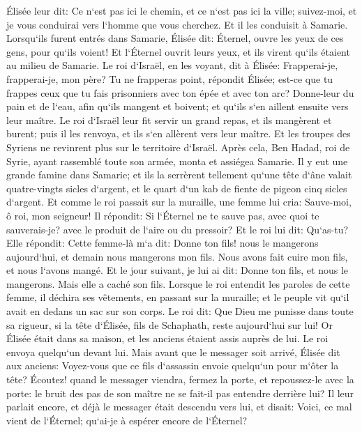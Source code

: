 \verse Élisée leur dit: Ce n`est pas ici le chemin, et ce n`est pas ici la ville; suivez-moi, et je vous conduirai vers l`homme que vous cherchez. Et il les conduisit à Samarie. 
\verse Lorsqu`ils furent entrés dans Samarie, Élisée dit: Éternel, ouvre les yeux de ces gens, pour qu`ils voient! Et l`Éternel ouvrit leurs yeux, et ils virent qu`ils étaient au milieu de Samarie. 
\verse Le roi d`Israël, en les voyant, dit à Élisée: Frapperai-je, frapperai-je, mon père? 
\verse Tu ne frapperas point, répondit Élisée; est-ce que tu frappes ceux que tu fais prisonniers avec ton épée et avec ton arc? Donne-leur du pain et de l`eau, afin qu`ils mangent et boivent; et qu`ils s`en aillent ensuite vers leur maître. 
\verse Le roi d`Israël leur fit servir un grand repas, et ils mangèrent et burent; puis il les renvoya, et ils s`en allèrent vers leur maître. Et les troupes des Syriens ne revinrent plus sur le territoire d`Israël. 
\verse Après cela, Ben Hadad, roi de Syrie, ayant rassemblé toute son armée, monta et assiégea Samarie. 
\verse Il y eut une grande famine dans Samarie; et ils la serrèrent tellement qu`une tête d`âne valait quatre-vingts sicles d`argent, et le quart d`un kab de fiente de pigeon cinq sicles d`argent. 
\verse Et comme le roi passait sur la muraille, une femme lui cria: Sauve-moi, ô roi, mon seigneur! 
\verse Il répondit: Si l`Éternel ne te sauve pas, avec quoi te sauverais-je? avec le produit de l`aire ou du pressoir? 
\verse Et le roi lui dit: Qu`as-tu? Elle répondit: Cette femme-là m`a dit: Donne ton fils! nous le mangerons aujourd`hui, et demain nous mangerons mon fils. 
\verse Nous avons fait cuire mon fils, et nous l`avons mangé. Et le jour suivant, je lui ai dit: Donne ton fils, et nous le mangerons. Mais elle a caché son fils. 
\verse Lorsque le roi entendit les paroles de cette femme, il déchira ses vêtements, en passant sur la muraille; et le peuple vit qu`il avait en dedans un sac sur son corps. 
\verse Le roi dit: Que Dieu me punisse dans toute sa rigueur, si la tête d`Élisée, fils de Schaphath, reste aujourd`hui sur lui! 
\verse Or Élisée était dans sa maison, et les anciens étaient assis auprès de lui. Le roi envoya quelqu`un devant lui. Mais avant que le messager soit arrivé, Élisée dit aux anciens: Voyez-vous que ce fils d`assassin envoie quelqu`un pour m`ôter la tête? Écoutez! quand le messager viendra, fermez la porte, et repoussez-le avec la porte: le bruit des pas de son maître ne se fait-il pas entendre derrière lui? 
\verse Il leur parlait encore, et déjà le messager était descendu vers lui, et disait: Voici, ce mal vient de l`Éternel; qu`ai-je à espérer encore de l`Éternel? 


